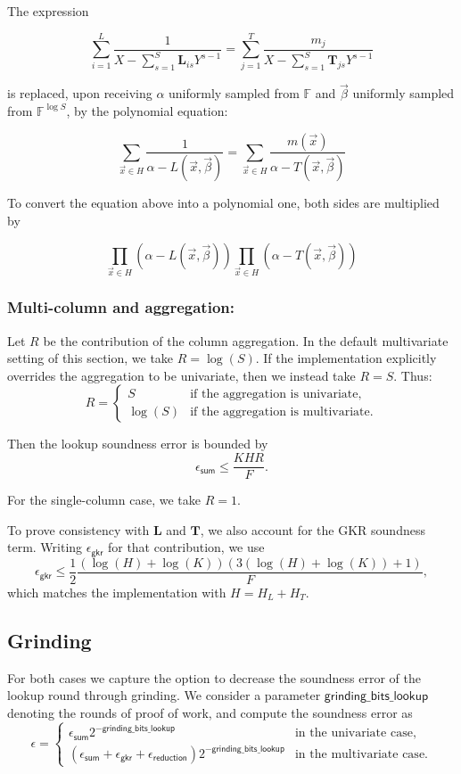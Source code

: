 The expression 

$$\sum_{i=1}^L \frac{1}{X- \sum_{s=1}^S \mathbf L_{is}Y^{s-1}}=\sum_{j=1}^T \frac{m_j}{X-\sum_{s=1}^S \mathbf T_{js}Y^{s-1}}$$

is replaced, upon receiving $\alpha$ uniformly sampled from $\mathbb{F}$ and $\vec \beta$ uniformly sampled from $\mathbb{F}^{\log S}$, by the polynomial equation:  

$$\sum_{\vec x\in H} \frac{1}{\alpha- L(\vec x, \vec \beta)}=\sum_{\vec x\in H} \frac{m(\vec x)}{\alpha-T(\vec x, \vec \beta)}$$


To convert the equation above into a polynomial one, both sides are multiplied by 

$$\prod_{\vec x\in H}(\alpha - L(\vec x, \vec \beta))\prod_{\vec x\in H}(\alpha - T(\vec x, \vec \beta))$$

\subsubsection{Multi-column and aggregation:}

Let $R$ be the contribution of the column aggregation. In the default multivariate setting of this section, we take $R=\log(S)$. If the implementation explicitly overrides the aggregation to be univariate, then we instead take $R=S$. Thus:
\[
R =
\begin{cases}
S & \text{if the aggregation is univariate,}\\
\log(S) & \text{if the aggregation is multivariate.}
\end{cases}
\]

Then the lookup soundness error is bounded by
\[
\epsilon_{\mathsf{sum}}\leq \frac{K H R}{F}.
\]

For the single-column case, we take $R=1$.

To prove consistency with $\mathbf L$ and $\mathbf T$, we also account for the
GKR soundness term. Writing $\epsilon_{\mathsf{gkr}}$ for that contribution, we
use
\[
\epsilon_{\mathsf{gkr}}
\leq \frac{1}{2}\frac{(\log(H)+\log(K))(3(\log(H)+\log(K))+1)}{F},
\]
which matches the implementation with $H = H_L + H_T$.

\subsection{Grinding}

For both cases we capture the option to decrease the soundness error of the lookup round through grinding. We consider a parameter $\mathsf{grinding\_bits\_lookup}$ denoting the rounds of proof of work, and compute the soundness error as
\[
\epsilon=
\begin{cases}
\epsilon_{\mathsf{sum}}2^{-\mathsf{grinding\_bits\_lookup}} & \text{in the univariate case,}\\
(\epsilon_{\mathsf{sum}}+\epsilon_{\mathsf{gkr}}+\epsilon_{\mathsf{reduction}})2^{-\mathsf{grinding\_bits\_lookup}} & \text{in the multivariate case.}
\end{cases}
\]
